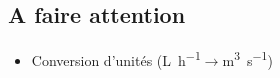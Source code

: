 \documentclass[]{article}
\begin{document}
\begin{multicols}{3}























\section{A faire attention}
\begin{mdframed}[linewidth=1pt,linecolor=OrangeRed]
\begin{itemize}
\item Conversion d'unités (\si{\liter\per\hour}$\longrightarrow$\si{\cubic\meter\per\second})
\end{itemize}
\end{mdframed}


\end{multicols}
\end{document}

